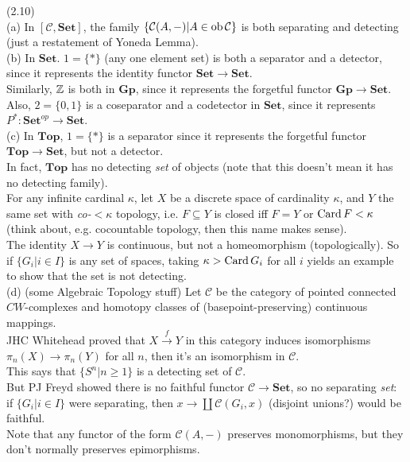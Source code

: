 \documentclass[a4paper]{article}
\begin{document}
\begin{eg} (2.10)\\
    (a) In $[\mathcal{C},\mathbf{Set}]$, the family $\{\mathcal{C}(A,-)|A \in \operatorname{ob}\mathcal{C}\}$ is both separating and detecting (just a restatement of Yoneda Lemma).\\
    (b) In $\mathbf{Set}$. $1=\{*\}$ (any one element set) is both a separator and a detector, since it represents the identity functor $\mathbf{Set} \to \mathbf{Set}$.\\
    Similarly, $\mathbb{Z}$ is both in $\mathbf{Gp}$, since it represents the forgetful functor $\mathbf{Gp} \to \mathbf{Set}$.\\
    Also, $2 = \{0,1\}$ is a coseparator and a codetector in $\mathbf{Set}$, since it represents $P^*: \mathbf{Set}^{op} \to \mathbf{Set}$.\\
    (c) In $\mathbf{Top}$, $1=\{*\}$ is a separator since it represents the forgetful functor $\mathbf{Top} \to \mathbf{Set}$, but not a detector.\\
    In fact, $\mathbf{Top}$ has no detecting \emph{set} of objects (note that this doesn't mean it has no detecting family).\\
    For any infinite cardinal $\kappa$, let $X$ be a discrete space of cardinality $\kappa$, and $Y$ the same set with \emph{co-$<\kappa$} topology, i.e. $F \subseteq Y$ is closed iff $F=Y$ or $\operatorname{Card} F < \kappa$ (think about, e.g. cocountable topology, then this name makes sense).\\
    The identity $X \to Y$ is continuous, but not a homeomorphism (topologically). So if $\{G_i|i \in I\}$ is any set of spaces, taking $\kappa > \operatorname{Card} G_i$ for all $i$ yields an example to show that the set is not detecting.\\
    (d) (some Algebraic Topology stuff) Let $\mathcal{C}$ be the category of pointed connected $CW$-complexes and homotopy classes of (basepoint-preserving) continuous mappings.\\
    JHC Whitehead proved that $X \xrightarrow{f} Y$ in this category induces isomorphisms $\pi_n(X) \to \pi_n(Y)$ for all $n$, then it's an isomorphism in $\mathcal{C}$.\\
    This says that $\{S^n | n \geq 1\}$ is a detecting set of $\mathcal{C}$.\\
    But PJ Freyd showed there is no faithful functor $\mathcal{C} \to \mathbf{Set}$, so no separating \emph{set}: if $\{ G_i | i \in I\}$ were separating, then $x \to \coprod \mathcal{C}(G_i,x)$ (disjoint unions?) would be faithful.\\
    Note that any functor of the form $\mathcal{C}(A,-)$ preserves monomorphisms, but they don't normally preserves epimorphisms.
\end{eg}
\end{document}
